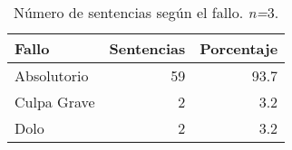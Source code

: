 \begin{table}[H]
\centering
\caption{Número de sentencias según el fallo. \textit{n=}3.} 
\label{tab:fallo}
\begin{tabular}{lrr}
  \hline
Fallo & Sentencias & Porcentaje \\ 
  \hline
Absolutorio & 59 & 93.7 \\ 
  Culpa Grave &  2 & 3.2 \\ 
  Dolo &  2 & 3.2 \\ 
   \hline
\end{tabular}
\end{table}
